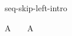 \begin{circuslaw}{seq-skip-left-intro}
\begin{circusaction*}
  A ~ \equiv ~ \Skip \circseq A
\end{circusaction*}
\end{circuslaw}
